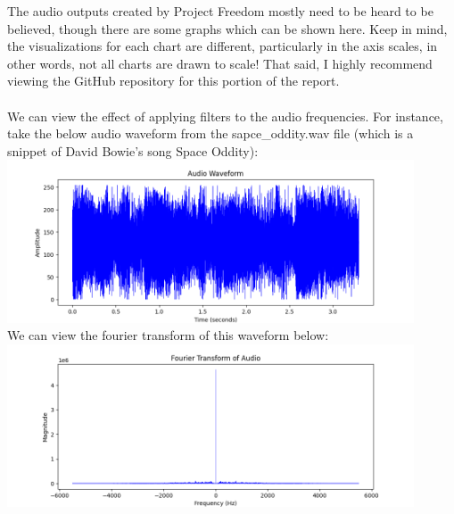 \documentclass[notitlepage]{article}
\begin{document}
The audio outputs created by Project Freedom mostly need to be heard to be
believed, though there are some graphs which can be shown here. Keep in mind,
the visualizations for each chart are different, particularly in the
axis scales, in other words, not all charts are drawn to scale! That said,
I highly recommend viewing the GitHub repository for this portion of the
report.
\\\\
We can view the effect of applying filters to the audio frequencies. For instance,
take the below audio waveform from the sapce\_oddity.wav file (which is a snippet of
David Bowie's song Space Oddity):
\\
\includegraphics[width=4.75in]{../samples/audio/space_oddity_waveform.png}
\\
We can view the fourier transform of this waveform below:
\\
\includegraphics[width=4.75in]{../samples/audio/space_oddity_fourier_transform.png}
\end{document}
